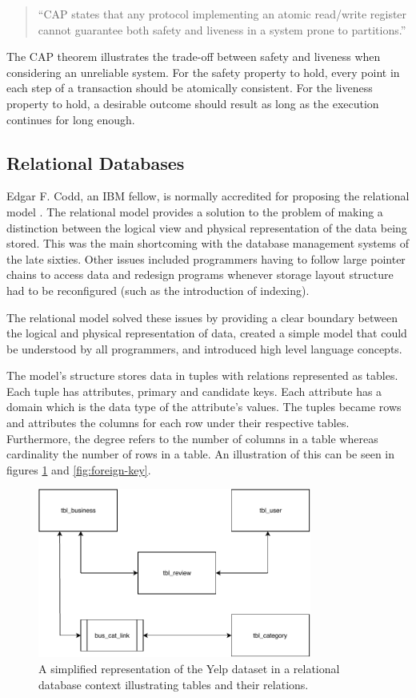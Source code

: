 \begin{quote}
    ``CAP states that any protocol implementing an atomic read/write register cannot guarantee both safety and liveness in a system prone to partitions.''
\end{quote}

The CAP theorem illustrates the trade-off between safety and liveness when considering an unreliable system. For the safety property to hold, every point in each step of a transaction should be atomically consistent. For the liveness property to hold, a desirable outcome should result as long as the execution continues for long enough.

\subsection{Relational Databases}

Edgar F. Codd, an IBM fellow, is normally accredited for proposing the relational model \cite{relational-db}. The relational model provides a solution to the problem of making a distinction between the logical view and physical representation of the data being stored. This was the main shortcoming with the database management systems of the late sixties. Other issues included programmers having to follow large pointer chains to access data and redesign programs whenever storage layout structure had to be reconfigured (such as the introduction of indexing).

The relational model solved these issues by providing a clear boundary between the logical and physical representation of data, created a simple model that could be understood by all programmers, and introduced high level language concepts.

The model's structure stores data in tuples with relations represented as tables. Each tuple has attributes, primary and candidate keys. Each attribute has a domain which is the data type of the attribute's values. The tuples became rows and attributes the columns for each row under their respective tables. Furthermore, the degree refers to the number of columns in a table whereas cardinality the number of rows in a table. An illustration of this can be seen in figures \ref{fig:relational-database} and \ref{fig:foreign-key}.

\begin{figure}[h]
    \centering
    \includegraphics[width=9cm]{img/relational-database.pdf}
    \caption{A simplified representation of the Yelp dataset in a relational database context illustrating tables and their relations.}
    \label{fig:relational-database}
\end{figure}

